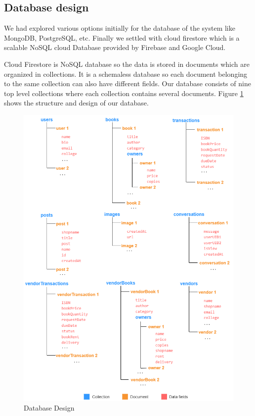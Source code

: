 \documentclass[conference]{IEEEtran}
\begin{document}
\subsection{Database design}
We had explored various options initially for the database of the system like MongoDB, PostgreSQL, etc. Finally we settled with cloud firestore which is a scalable NoSQL cloud Database provided by Firebase and Google Cloud.

Cloud Firestore is NoSQL database so the data is stored in documents which are organized in collections. It is a schemaless database so each document belonging to the same collection can also have different fields. Our database consists of nine top level collections where each collection contains several documents. Figure \ref{fig:databasedesign} shows the structure and design of our database.
\begin{figure}[h]
     \centering
     \includegraphics[scale=0.30,margin=2,frame]{Database-design.png}
     \caption{Database Design}
     \label{fig:databasedesign}
 \end{figure}
 
\end{document}
